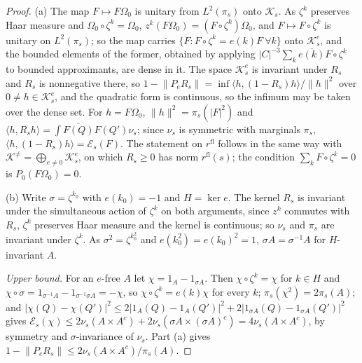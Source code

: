 \documentclass[11pt,a4paper]{amsart}
\theoremstyle{definition}
\theoremstyle{remark}
\numberwithin{equation}{section}
\newcommand{\Kspace}{\mathcal{K}}    %
\newcommand{\ip}[2]{\langle #1,#2\rangle}  %
\newcommand{\norm}[1]{\lVert #1\rVert}     %
\newcommand{\abs}[1]{\lvert #1\rvert}      %
\newcommand{\Omegazero}{\Omega_0}          %
\begin{document}
\begin{proof}
(a) The map $F\mapsto F\Omegazero$ is unitary from $L^2(\pi_s)$ onto $\Kspace_s$. As $\zeta^k$ preserves Haar measure and $\Omegazero\circ\zeta^k=\Omegazero$, $z^k(F\Omegazero)=(F\circ\zeta^k)\Omegazero$, and $F\mapsto F\circ\zeta^k$ is unitary on $L^2(\pi_s)$; so the map carries $\{F:F\circ\zeta^k=e(k)F\ \forall k\}$ onto $\Kspace^e_s$, and the bounded elements of the former, obtained by applying $\abs{C}^{-3}\sum_k\overline{e(k)}F\circ\zeta^k$ to bounded approximants, are dense in it. The space $\Kspace^e_s$ is invariant under $R_s$ and $R_s$ is nonnegative there, so $1-\norm{P_eR_s}=\inf\ip h{(1-R_s)h}/\norm h^2$ over $0\ne h\in\Kspace^e_s$, and the quadratic form is continuous, so the infimum may be taken over the dense set. For $h=F\Omegazero$, $\norm h^2=\pi_s(\abs F^2)$ and $\ip h{R_sh}=\int\overline{F(Q)}F(Q')\nu_s$; since $\nu_s$ is symmetric with marginals $\pi_s$, $\ip h{(1-R_s)h}=\mathcal E_s(F)$. The statement on $r^{\mathrm{fl}}$ follows in the same way with $\Kspace^{\ne}=\bigoplus_{e\ne0}\Kspace^e_s$, on which $R_s\ge0$ has norm $r^{\mathrm{fl}}(s)$; the condition $\sum_kF\circ\zeta^k=0$ is $P_0(F\Omegazero)=0$.

(b) Write $\sigma=\zeta^{k_0}$ with $e(k_0)=-1$ and $H=\ker e$. The kernel $R_s$ is invariant under the simultaneous action of $\zeta^k$ on both arguments, since $z^k$ commutes with $R_s$, $\zeta^k$ preserves Haar measure and the kernel is continuous; so $\nu_s$ and $\pi_s$ are invariant under $\zeta^k$. As $\sigma^2=\zeta^{k_0^2}$ and $e(k_0^2)=e(k_0)^2=1$, $\sigma A=\sigma^{-1}A$ for $H$-invariant $A$.

\emph{Upper bound.} For an $e$-free $A$ let $\chi=1_A-1_{\sigma A}$. Then $\chi\circ\zeta^k=\chi$ for $k\in H$ and $\chi\circ\sigma=1_{\sigma^{-1}A}-1_{\sigma^{-1}\sigma A}=-\chi$, so $\chi\circ\zeta^k=e(k)\chi$ for every $k$; $\pi_s(\chi^2)=2\pi_s(A)$; and $\abs{\chi(Q)-\chi(Q')}^2\le2\abs{1_A(Q)-1_A(Q')}^2+2\abs{1_{\sigma A}(Q)-1_{\sigma A}(Q')}^2$ gives $\mathcal E_s(\chi)\le2\nu_s(A\times A^c)+2\nu_s(\sigma A\times(\sigma A)^c)=4\nu_s(A\times A^c)$, by symmetry and $\sigma$-invariance of $\nu_s$. Part (a) gives $1-\norm{P_eR_s}\le2\nu_s(A\times A^c)/\pi_s(A)$.


\end{proof}
\end{document}

